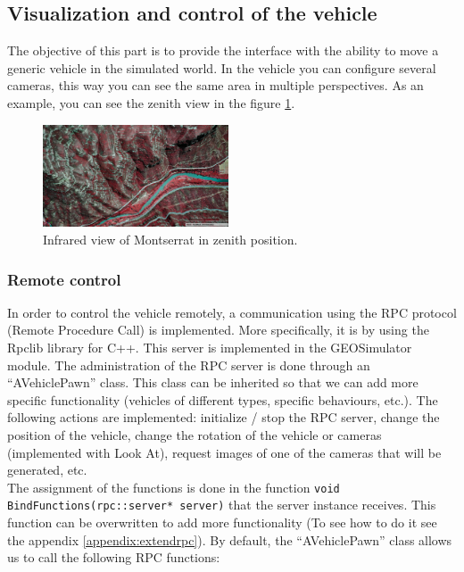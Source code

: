 \documentclass[10pt,a4paper,twocolumn,twoside]{article}
\begin{document}
\subsection{Visualization and control of the vehicle}

The objective of this part is to provide the interface with the ability to move a generic vehicle in the simulated world. In the vehicle you can configure several cameras, this way you can see the same area in multiple perspectives. As an example, you can see the zenith view in the figure \ref{fig-montserratir}.

\begin{figure}[h]
\centering
  	\includegraphics[width=0.49\textwidth]{cenitalviewir}
	\caption{Infrared view of Montserrat in zenith position.}
	\label{fig-montserratir}
\end{figure}

\subsubsection{Remote control}
\label{rpcserver}

In order to control the vehicle remotely, a communication using the RPC protocol (Remote Procedure Call) is implemented. More specifically, it is by using the Rpclib \cite{rpclib} library for C++. This server is implemented in the GEOSimulator module. The administration of the RPC server is done through an ``AVehiclePawn'' class. This class can be inherited so that we can add more specific functionality (vehicles of different types, specific behaviours, etc.). The following actions are implemented: initialize / stop the RPC server, change the position of the vehicle, change the rotation of the vehicle or cameras (implemented with Look At), request images of one of the cameras that will be generated, etc.
\\
The assignment of the functions is done in the function \texttt{void BindFunctions(rpc::server* server)} that the server instance receives. This function can be overwritten to add more functionality (To see how to do it see the appendix \ref{appendix:extendrpc}). By default, the ``AVehiclePawn'' class allows us to call the following RPC functions:
\end{document}
